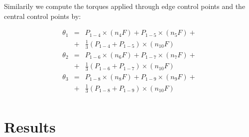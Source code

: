 \documentclass{egpubl}
\begin{document}
Similarily we compute the torques applied through edge control points and
the central control points by:

\begin{eqnarray}
    \theta_1 & = & P_{1-4} \times (n_4 F) + P_{1-5} \times (n_5 F) + \\
        & + & \frac{1}{3} (P_{1-4} + P_{1-5}) \times (n_{10} F) \\
    \theta_2 & = & P_{1-6} \times (n_6 F) + P_{1-7} \times (n_7 F) + \\
        & + & \frac{1}{3} (P_{1-6} + P_{1-7}) \times (n_{10} F) \\
    \theta_3 & = & P_{1-8} \times (n_8 F) + P_{1-9} \times (n_9 F) + \\
        & + & \frac{1}{3} (P_{1-8} + P_{1-9}) \times (n_{10} F) \\
\end{eqnarray}

%



\section{Results}
\end{document}
